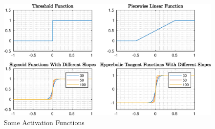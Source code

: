 \begin{figure}
	\begin{center}
		\includegraphics[width=\textwidth]{figures/several_activations.eps}
		\caption{Some Activation Functions}
		\label{fig:activation_fncs}
	\end{center}
\end{figure}
